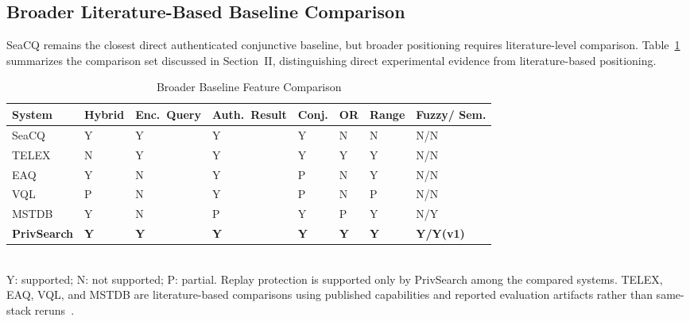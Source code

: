 \subsection{Broader Literature-Based Baseline Comparison}
\label{4H}
SeaCQ remains the closest direct authenticated conjunctive baseline, but broader positioning requires literature-level comparison. Table~\ref{tab:broader} summarizes the comparison set discussed in Section~II, distinguishing direct experimental evidence from literature-based positioning.
\begin{table}[t]
\centering
\caption{Broader Baseline Feature Comparison}
\label{tab:broader}
\scriptsize
\setlength{\tabcolsep}{3pt}
\begin{tabular}{@{}p{1.3cm}>{\centering\arraybackslash}p{0.85cm}>{\centering\arraybackslash}p{0.95cm}>{\centering\arraybackslash}p{0.95cm}>{\centering\arraybackslash}p{0.75cm}>{\centering\arraybackslash}p{0.6cm}>{\centering\arraybackslash}p{0.75cm}>{\centering\arraybackslash}p{0.85cm}@{}}
\toprule
\textbf{System} & \textbf{Hybrid} & \textbf{Enc.\ Query} & \textbf{Auth.\ Result} & \textbf{Conj.} & \textbf{OR} & \textbf{Range} & \textbf{Fuzzy/ Sem.} \\
\midrule
SeaCQ~\cite{Yang}  & Y & Y & Y & Y & N & N & N/N \\
TELEX~\cite{WuHaotian} & N & Y & Y & Y & Y & Y & N/N \\
EAQ~\cite{Yin}    & Y & N & Y & P & N & Y & N/N \\
VQL~\cite{WuHaotianPeng}   & P & N & Y & P & N & P & N/N \\
MSTDB~\cite{Zhou}  & Y & N & P & Y & P & Y & N/Y \\
\textbf{PrivSearch} & \textbf{Y} & \textbf{Y} & \textbf{Y} & \textbf{Y} & \textbf{Y} & \textbf{Y} & \textbf{Y/Y(v1)} \\
\bottomrule
\end{tabular}
\\[2pt]
\footnotesize Y: supported; N: not supported; P: partial. Replay protection is supported only by PrivSearch among the compared systems. TELEX, EAQ, VQL, and MSTDB are literature-based comparisons using published capabilities and reported evaluation artifacts rather than same-stack reruns~\cite{WuHaotian,Yin,WuHaotianPeng,Zhou}.
\end{table}

